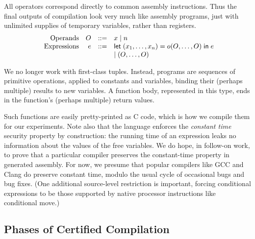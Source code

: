 \documentclass[conference,letterpaper]{IEEEtran}
\newcommand{\kw}[1]{\mathsf{#1}}
\begin{document}
All operators correspond directly to common assembly instructions.
Thus the final outputs of compilation look very much like assembly programs, just with unlimited supplies of temporary variables, rather than registers.
$$\begin{array}{rrcl@{}}
  \textrm{Operands} & O &::=& x \mid n \\
  \textrm{Expressions} & e &::=& \kw{let} \; (x_1, \ldots, x_n) = o(O, \ldots, O) \; \kw{in} \; e \\
  &&& \mid (O, \ldots, O)
\end{array}$$

We no longer work with first-class tuples.
Instead, programs are sequences of primitive operations, applied to constants and variables, binding their (perhaps multiple) results to new variables.
A function body, represented in this type, ends in the function's (perhaps multiple) return values.

Such functions are easily pretty-printed as C code, which is how we compile them for our experiments.
Note also that the language enforces the \emph{constant time} security property by construction: the running time of an expression leaks no information about the values of the free variables.
We do hope, in follow-on work, to prove that a particular compiler preserves the constant-time property in generated assembly.
For now, we presume that popular compilers like GCC and Clang do preserve constant time, modulo the usual cycle of occasional bugs and bug fixes.
(One additional source-level restriction is important, forcing conditional expressions to be those supported by native processor instructions like conditional move.)

\subsection{Phases of Certified Compilation}

\end{document}
